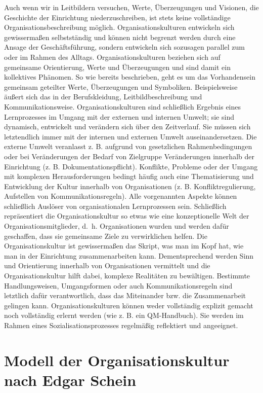 \documentclass[
  letterpaper,
]{book}
\begin{document}
Auch wenn wir in Leitbildern versuchen, Werte, Überzeugungen und
Visionen, die Geschichte der Einrichtung niederzuschreiben, ist stets
keine vollständige Organisationsbeschreibung möglich.
Organisationskulturen entwickeln sich gewissermaßen selbstständig und
können nicht begrenzt werden durch eine Ansage der Geschäftsführung,
sondern entwickeln sich sozusagen parallel zum oder im Rahmen des
Alltags. Organisationskulturen beziehen sich auf gemeinsame
Orientierung, Werte und Überzeugungen und sind damit ein kollektives
Phänomen. So wie bereits beschrieben, geht es um das Vorhandensein
gemeinsam geteilter Werte, Überzeugungen und Symboliken. Beispielsweise
äußert sich das in der Berufskleidung, Leitbildbeschreibung und
Kommunikationsweise. Organisationskulturen sind schließlich Ergebnis
eines Lernprozesses im Umgang mit der externen und internen Umwelt; sie
sind dynamisch, entwickelt und verändern sich über den Zeitverlauf. Sie
müssen sich letztendlich immer mit der internen und externen Umwelt
auseinandersetzen. Die externe Umwelt veranlasst z. B. aufgrund von
gesetzlichen Rahmenbedingungen oder bei Veränderungen der Bedarf von
Zielgruppe Veränderungen innerhalb der Einrichtung (z. B.
Dokumentationspflicht). Konflikte, Probleme oder der Umgang mit
komplexen Herausforderungen bedingt häufig auch eine Thematisierung und
Entwicklung der Kultur innerhalb von Organisationen (z. B.
Konfliktregulierung, Aufstellen von Kommunikationsregeln). Alle
vorgenannten Aspekte können schließlich Auslöser von organisationalen
Lernprozessen sein. Schließlich repräsentiert die Organisationskultur so
etwas wie eine konzeptionelle Welt der Organisationsmitglieder, d.~h.
Organisationen wurden und werden dafür geschaffen, dass sie gemeinsame
Ziele zu verwirklichen helfen. Die Organisationskultur ist gewissermaßen
das Skript, was man im Kopf hat, wie man in der Einrichtung
zusammenarbeiten kann. Dementsprechend werden Sinn und Orientierung
innerhalb von Organisationen vermittelt und die Organisationskultur
hilft dabei, komplexe Realitäten zu bewältigen. Bestimmte
Handlungsweisen, Umgangsformen oder auch Kommunikationsregeln sind
letztlich dafür verantwortlich, dass das Miteinander bzw. die
Zusammenarbeit gelingen kann. Organisationskulturen können weder
vollständig explizit gemacht noch vollständig erlernt werden (wie z. B.
ein QM-Handbuch). Sie werden im Rahmen eines Sozialisationsprozesses
regelmäßig reflektiert und angeeignet.

\section{Modell der Organisationskultur nach Edgar
Schein}\label{modell-der-organisationskultur-nach-edgar-schein}
\end{document}
